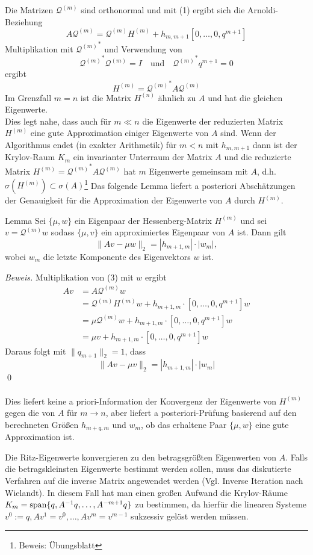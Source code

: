 Die Matrizen $\mathcal{Q}^{(m)}$ sind orthonormal und mit (1) ergibt sich die Arnoldi-Beziehung 
\[A\mathcal{Q}^{(m)} = \mathcal{Q}^{(m)} H^{(m)} + h_{m,m+1}[0,\dotsc,0,q^{m+1}]\tag{3}\]
Multiplikation mit ${\mathcal{Q}^{(m)}}^*$  und Verwendung von 
\[{\mathcal{Q}^{(m)}}^* \mathcal{Q}^{(m)} = I \quad \text{und}\quad {\mathcal{Q}^{(m)}}^* q^{m+1}=0\]
ergibt 
\[H^{(m)} = {\mathcal{Q}^{(m)}}^* A \mathcal{Q}^{(m)}\]
Im Grenzfall $m=n$ ist die Matrix $H^{(n)}$ ähnlich zu $A$ und hat die gleichen Eigenwerte. \\
Dies legt nahe, dass auch für $m\ll n$ die Eigenwerte der reduzierten Matrix $H^{(m)}$ eine gute Approximation 
einiger Eigenwerte von $A$ sind. Wenn der Algorithmus endet (in exakter Arithmetik) für $m<n$ mit $h_{m,m+1}$ dann
ist der Krylov-Raum $K_m$ ein invarianter Unterraum der Matrix $A$ und die reduzierte Matrix $H^{(m)} = 
{\mathcal{Q}^{(m)}}^* A \mathcal{Q}^{(m)}$ hat $m$ Eigenwerte gemeinsam mit $A$, d.h. $\sigma(H^{(m)})\subset \sigma(A)$\footnote{Beweis: Übungsblatt}
Das folgende Lemma liefert a posteriori Abschätzungen der Genauigkeit für die Approximation der Eigenwerte von $A$ durch 
$H^{(m)}$.
\begin{thmbox}{Lemma}
    Sei $\{\mu,w\}$ ein Eigenpaar der Hessenberg-Matrix $H^{(m)}$ und sei $v=\mathcal{Q}^{(m)}w$ sodass $\{\mu,v\}$ ein 
    approximiertes Eigenpaar von $A$ ist. Dann gilt
    \[\|Av-\mu w\|_2 = |h_{m+1,m}|\cdot |w_m|,\] 
    wobei $w_m$ die letzte Komponente des Eigenvektors $w$ ist.
\end{thmbox}
\textit{Beweis.} Multiplikation von (3) mit $w$ ergibt 
\begin{align*}
Av &= A\mathcal{Q}^{(m)}w\\ 
&= \mathcal{Q}^{(m)}H^{(m)}w + h_{m+1,m}\cdot[0,\dotsc,0,q^{m+1}]w \\
&= \mu \mathcal{Q}^{(m)}w + h_{m+1,m}\cdot[0,\dotsc,0,q^{m+1}]w \\
&= \mu v + h_{m+1,m}\cdot[0,\dotsc,0,q^{m+1}]w
\end{align*}
Daraus folgt mit $\|q_{m+1}\|_2 = 1$, dass
\[\|Av-\mu v\|_2 = |h_{m+1,m}|\cdot |w_m|\]
\qed \\ \\
Dies liefert keine a priori-Information der Konvergenz der Eigenwerte von $H^{(m)}$ gegen die von $A$ für $m\to n$, aber
liefert a posteriori-Prüfung basierend auf den berechneten Größen $h_{m+q,m}$ und $w_m$, ob das erhaltene Paar 
$\{\mu,w\}$ eine gute Approximation ist.
\begin{rembox}
    Die Ritz-Eigenwerte konvergieren zu den betragsgrößten Eigenwerten von $A$. Falls die betragskleinsten Eigenwerte 
    bestimmt werden sollen, muss das diskutierte Verfahren auf die inverse Matrix angewendet werden (Vgl. Inverse 
    Iteration nach Wielandt). In diesem Fall hat man einen großen Aufwand die Krylov-Räume 
    $K_m = \text{span}\{q,A^{-1}q,\dotsc,A^{-m+1}q\}$ zu bestimmen, da hierfür die linearen Systeme $v^0:=q, Av^1=v^0, 
    \dotsc, Av^m=v^{m-1}$ sukzessiv gelöst werden müssen.
\end{rembox}
